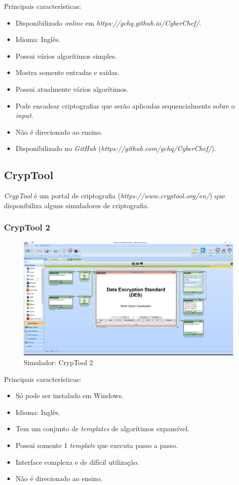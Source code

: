 Principais características:
\begin{itemize}
    \item Disponibilizado \textit{online} em \textit{https://gchq.github.io/CyberChef/}.
    \item Idioma: Inglês.
    \item Possui vários algorítimos simples.
    \item Mostra somente entradas e saídas.
    \item Possui atualmente vários algorítimos.
    \item Pode encadear criptografias que serão aplicadas sequencialmente sobre o \textit{input}.
    \item Não é direcionado ao ensino.
    \item Disponibilizado no \textit{GitHub} (\textit{https://github.com/gchq/CyberChef/}).
\end{itemize}

\subsection{CrypTool}

\textit{CrypTool} é um portal de criptografia (\textit{https://www.cryptool.org/en/}) que disponibiliza alguns simuladores de criptografia.

\subsubsection{CrypTool 2}

\begin{figure}[H]
    \centering
    \caption{Simulador: CrypTool 2}
    \includegraphics[width=1\linewidth]{Simuladores/CrypTool2.png}
\end{figure}

Principais características:
\begin{itemize}
    \item Só pode ser instalado em Windows.
    \item Idioma: Inglês.
    \item Tem um conjunto de \textit{templates} de algorítimos expansível.
    \item Possui somente 1 \textit{template} que executa passo a passo.
    \item Interface complexa e de difícil utilização.
    \item Não é direcionado ao ensino.
\end{itemize}

